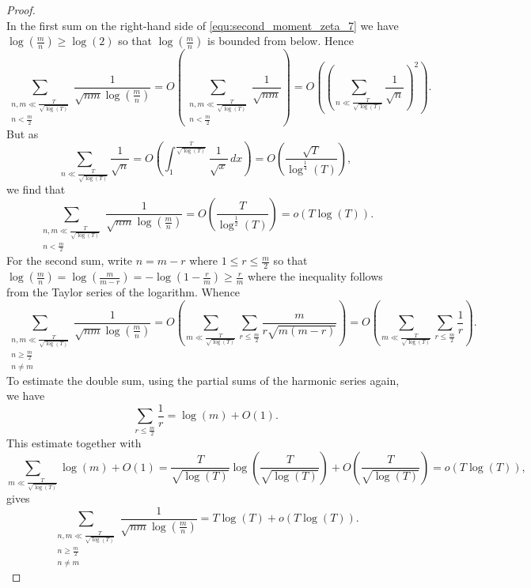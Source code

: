 \begin{proof}
\begin{equation}
      \end{equation}
      In the first sum on the right-hand side of \cref{equ:second_moment_zeta_7} we have $\log\left(\frac{m}{n}\right) \ge \log\left(2\right)$ so that $\log\left(\frac{m}{n}\right)$ is bounded from below. Hence
      \[
        \sum_{\substack{n,m \ll \frac{T}{\sqrt{\log(T)}} \\ n < \frac{m}{2}}}\frac{1}{\sqrt{nm}\log\left(\frac{m}{n}\right)} = O\left(\sum_{\substack{n,m \ll \frac{T}{\sqrt{\log(T)}} \\ n < \frac{m}{2}}}\frac{1}{\sqrt{nm}}\right) = O\left(\left(\sum_{n \ll \frac{T}{\sqrt{\log(T)}}}\frac{1}{\sqrt{n}}\right)^{2}\right).
      \]
      But as
      \[
        \sum_{n \ll \frac{T}{\sqrt{\log(T)}}}\frac{1}{\sqrt{n}} = O\left(\int_{1}^{\frac{T}{\sqrt{\log(T)}}}\frac{1}{\sqrt{x}}\,dx\right) = O\left(\frac{\sqrt{T}}{\log^{\frac{1}{4}}(T)}\right),
      \]
      we find that
      \begin{equation}\label{equ:second_moment_zeta_8}
        \sum_{\substack{n,m \ll \frac{T}{\sqrt{\log(T)}} \\ n < \frac{m}{2}}}\frac{1}{\sqrt{nm}\log\left(\frac{m}{n}\right)} = O\left(\frac{T}{\log^{\frac{1}{2}}(T)}\right) = o(T\log(T)).
      \end{equation}
      For the second sum, write $n = m-r$ where $1 \le r \le \frac{m}{2}$ so that $\log\left(\frac{m}{n}\right) = \log\left(\frac{m}{m-r}\right) = -\log(1-\frac{r}{m}) \ge \frac{r}{m}$ where the inequality follows from the Taylor series of the logarithm. Whence
      \[
        \sum_{\substack{n,m \ll \frac{T}{\sqrt{\log(T)}} \\ n \ge \frac{m}{2} \\ n \neq m}}\frac{1}{\sqrt{nm}\log\left(\frac{m}{n}\right)} = O\left(\sum_{m \ll \frac{T}{\sqrt{\log(T)}}}\sum_{r \le \frac{m}{2}}\frac{m}{r\sqrt{m(m-r)}}\right) = O\left(\sum_{m \ll \frac{T}{\sqrt{\log(T)}}}\sum_{r \le \frac{m}{2}}\frac{1}{r}\right).
      \]
      To estimate the double sum, using the partial sums of the harmonic series again, we have
      \[
        \sum_{r \le \frac{m}{2}}\frac{1}{r} = \log(m)+O(1).
      \]
      This estimate together with
      \[
        \sum_{m \ll \frac{T}{\sqrt{\log(T)}}}\log(m)+O(1) = \frac{T}{\sqrt{\log(T)}}\log\left(\frac{T}{\sqrt{\log(T)}}\right)+O\left(\frac{T}{\sqrt{\log(T)}}\right) = o(T\log(T)),
      \]
      gives
      \begin{equation}\label{equ:second_moment_zeta_9}
        \sum_{\substack{n,m \ll \frac{T}{\sqrt{\log(T)}} \\ n \ge \frac{m}{2} \\ n \neq m}}\frac{1}{\sqrt{nm}\log\left(\frac{m}{n}\right)} = T\log(T)+o(T\log(T)).

\end{equation}
\end{proof}
